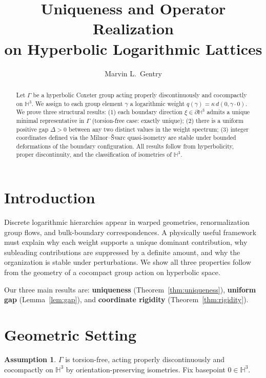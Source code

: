 ﻿\documentclass[12pt]{article}
\title{Uniqueness and Operator Realization\\on Hyperbolic Logarithmic Lattices}
\author{Marvin L.\ Gentry}
\date{}
\theoremstyle{definition}
\newtheorem{assumption}[theorem]{Assumption}
\theoremstyle{remark}
\newcommand{\Hthree}{\mathbb{H}^3}
\newcommand{\GammaG}{\Gamma}
\newcommand{\bdry}{\partial\mathbb{H}^3}
\begin{document}
\maketitle

\begin{abstract}
Let $\GammaG$ be a hyperbolic Coxeter group acting properly discontinuously
and cocompactly on $\mathbb{H}^3$. We assign to each group element $\gamma$
a logarithmic weight $q(\gamma)=\kappa\,d(0,\gamma\cdot0)$. We prove three
structural results: (1) each boundary direction $\xi\in\bdry$ admits a
unique minimal representative in $\GammaG$ (torsion-free case: exactly
unique); (2) there is a uniform positive gap $\Delta>0$ between any two
distinct values in the weight spectrum; (3) integer coordinates defined via
the Milnor--\v{S}varc quasi-isometry are stable under bounded deformations
of the boundary configuration. All results follow from hyperbolicity, proper
discontinuity, and the classification of isometries of $\mathbb{H}^3$.
\end{abstract}

\section{Introduction}

Discrete logarithmic hierarchies appear in warped geometries, renormalization
group flows, and bulk-boundary correspondences. A physically useful framework
must explain why each weight supports a unique dominant contribution, why
subleading contributions are suppressed by a definite amount, and why the
organization is stable under perturbations. We show all three properties
follow from the geometry of a cocompact group action on hyperbolic space.

Our three main results are: \textbf{uniqueness}
(Theorem~\ref{thm:uniqueness}), \textbf{uniform gap} (Lemma~\ref{lem:gap}),
and \textbf{coordinate rigidity} (Theorem~\ref{thm:rigidity}).

\section{Geometric Setting}

\begin{assumption}\label{ass:action}
$\GammaG$ is torsion-free, acting properly discontinuously and cocompactly
on $\Hthree$ by orientation-preserving isometries. Fix basepoint $0\in\Hthree$.
\end{assumption}
\end{document}
